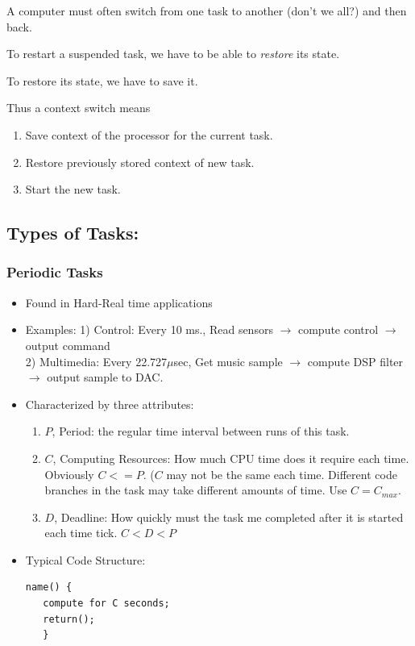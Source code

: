 \documentclass{article}	%
\begin{document}
A computer must often switch from one task to another (don't we all?) and then back.

To restart a suspended task, we have to be able to {\it restore} its state. 

To restore its state, we have to save it.  

Thus a context switch means
\begin{enumerate}
  \item Save context of the processor for the current task.
  \item Restore previously stored context of new task.
  \item Start the new task.
\end{enumerate}


\subsection{Types of Tasks:}

\subsubsection{Periodic Tasks}\label{Periodic}
\begin{itemize}
        \item Found in  Hard-Real time applications
        \item Examples: 1) Control: Every 10 ms., Read sensors $\to$ compute control $\to$ output
command\\
          2) Multimedia: Every 22.727$\mu$sec,  Get music sample $\to$ compute DSP filter $\to$ output
sample to DAC.

        \item Characterized by three attributes:
                \begin{enumerate}
                        \item $P$, Period: the regular time interval between runs of this task.
                        \item $C$, Computing Resources: How much CPU time  does it require
each time. Obviously $C <= P$. ($C$ may not be the same each time.
Different code branches in the task may take different amounts of time. Use $C=C_{max}$.
                        \item $D$, Deadline: How quickly must the task me completed after it
is started each time tick. $C < D < P$
                \end{enumerate}
         \item Typical Code Structure:
\begin{verbatim}
name() {
   compute for C seconds;
   return();
   }
\end{verbatim}
\end{itemize}
\end{document}
